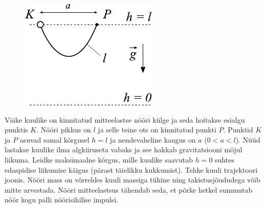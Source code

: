 
\begin{figure}
\vspace{-20pt}
  \begin{center}
    \includegraphics[width=1\linewidth]{2024-v2g-06-yl.pdf}
  \end{center}
  \vspace{-15pt}
\end{figure}

Väike kuulike on kinnitatud mitteelastse nööri külge ja seda hoitakse esialgu punktis $K$. Nööri pikkus on $l$ ja selle teine ots on kinnitatud punkti $P$. Punktid $K$ ja $P$ asuvad samal kõrgusel $h=l$ ja nendevaheline kaugus on $a$ ($0<a<l$). Nüüd lastakse kuulike ilma algkiiruseta vabaks ja see hakkab gravitatsiooni mõjul liikuma. Leidke maksimaalne kõrgus, mille kuulike saavutab $h=0$ suhtes edaspidise liikumise käigus (pärast täielikku kukkumist). Tehke kuuli trajektoori joonis. Nööri mass on võrreldes kuuli massiga tühine ning takistusjõududega võib mitte arvestada. Nööri mitteelastsus tähendab seda, et põrke hetkel summutab nöör kogu palli nöörisihilise impulsi.


\hint

